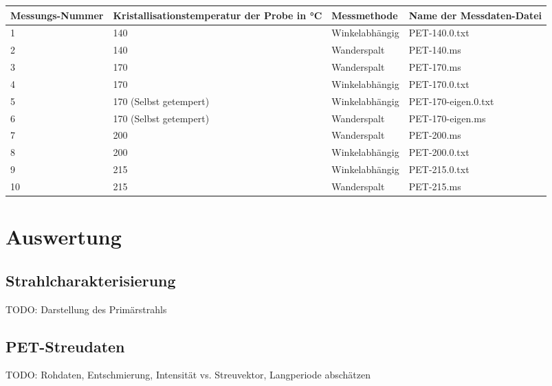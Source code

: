 \documentclass[bigchapter,colorback,accentcolor=tud4b,linedtoc,11pt]{tudreport}
\begin{document}
\begin{center}
  \begin{tabular}{|p{2.2cm}|p{4.5cm}|p{3cm}|p{4cm}|}
    \hline
    Messungs-Nummer & Kristallisationstemperatur der Probe in °C & Messmethode    & Name der Messdaten-Datei \\ \hline
    1               & 140                                        & Winkelabhängig & PET-140.0.txt \\ \hline
    2               & 140                                        & Wanderspalt    & PET-140.ms \\ \hline
    3               & 170                                        & Wanderspalt    & PET-170.ms \\ \hline
    4               & 170                                        & Winkelabhängig & PET-170.0.txt \\ \hline
    5               & 170 (Selbst getempert)                     & Winkelabhängig & PET-170-eigen.0.txt \\ \hline
    6               & 170 (Selbst getempert)                     & Wanderspalt    & PET-170-eigen.ms \\ \hline
    7               & 200                                        & Wanderspalt    & PET-200.ms \\ \hline
    8               & 200                                        & Winkelabhängig & PET-200.0.txt \\ \hline
    9               & 215                                        & Winkelabhängig & PET-215.0.txt \\ \hline
    10              & 215                                        & Wanderspalt    & PET-215.ms \\ \hline
	\end{tabular}
\end{center}

\chapter{Auswertung}
\section{Strahlcharakterisierung}
TODO: Darstellung des Primärstrahls

\section{PET-Streudaten}
TODO: Rohdaten, Entschmierung, Intensität vs. Streuvektor, Langperiode abschätzen
\end{document}
